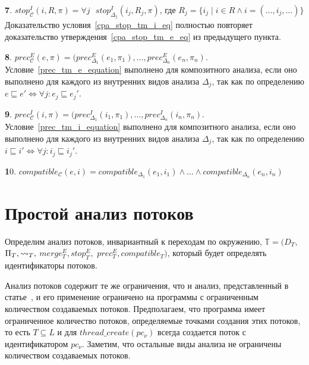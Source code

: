 {\textbf 7.}
$stop^I_{\mathscr{C}}(i,R,\pi)=\forall j \mbox{ } stop^I_{\Delta_j}(i_j, R_j, \pi)$, где $R_j = \{i_j \mid i \in R \land i = (\dots, i_j, \dots)\}$
Доказательство условия~\ref{cpa_stop_tm_i_eq} полностью повторяет доказательство утверждения~\ref{cpa_stop_tm_e_eq} из предыдущего пункта.

{\textbf 8.}
$prec^E_{\mathscr{C}}(e,\pi)=(prec^E_{\Delta_1}(e_1, \pi_1), \dots, prec^E_{\Delta_n}(e_n, \pi_n)$. Условие~\ref{prec_tm_e_equation} выполнено для композитного анализа, если оно выполнено для каждого из внутренних видов анализа $\Delta_j$, так как по определению $e \sqsubseteq e' \iff \forall j: e_j \sqsubseteq e_j'$.

{\textbf 9.}
$prec^I_{\mathscr{C}}(i,\pi)=(prec^I_{\Delta_1}(i_1, \pi_1), \dots, prec^I_{\Delta_n}(i_n, \pi_n)$. Условие~\ref{prec_tm_i_equation} выполнено для композитного анализа, если оно выполнено для каждого из внутренних видов анализа $\Delta_j$, так как по определению $i \sqsubseteq i' \iff \forall j: i_j \sqsubseteq i_j'$.

{\textbf 10.} 
$compatible_{\mathscr{C}}(e, i) = compatible_{\Delta_1}(e_1, i_1) \land \dots \land compatible_{\Delta_n}(e_n, i_n)$

\section{Простой анализ потоков}
\label{sect_thread_analysis}
Определим анализ потоков, инвариантный к переходам по окружению, 
$\mathbb{T}=(D_{T},$ $\Pi_{T}, \leadsto_{T},$ $merge^E_{T}, stop^E_{T},$ $prec^E_{T}, compatible_{T})$, который будет определять идентификаторы потоков.

Анализ потоков содержит те же ограничения, что и анализ, представленный в статье~\cite{ThreadModular03}, и его применение ограничено на программы с ограниченным количеством создаваемых потоков.
Предполагаем, что программа имеет ограниченное количество потоков, определяемые точками создания этих потоков, то есть $T\subseteq L$ и для $thread\_create(pc_\nu)$ всегда создается поток с идентификатором $pc_\nu$.
Заметим, что остальные виды анализа не ограничены количеством создаваемых потоков.

